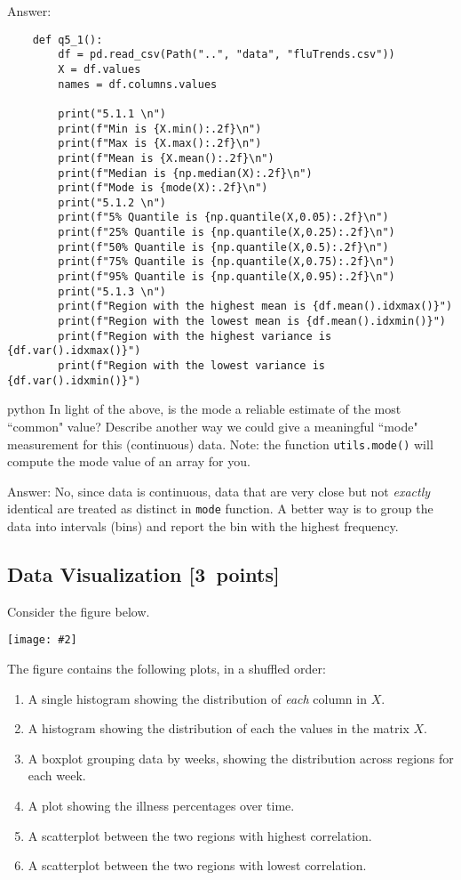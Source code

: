 \documentclass{article}
\newcommand{\blu}[1]{{\textcolor{blu}{#1}}}
\newenvironment{answer}{\par\begingroup\color{gre}Answer: }{\endgroup}
\let\ask\blu
\newcommand\pts[1]{\textcolor{pointscolour}{[#1~points]}}
\newcommand{\centerfig}[2]{\begin{center}\texttt{[image: \#2]}\end{center}}
\begin{document}
  \begin{answer}
      \begin{verbatim}
    def q5_1():
        df = pd.read_csv(Path("..", "data", "fluTrends.csv"))
        X = df.values
        names = df.columns.values
    
        print("5.1.1 \n")
        print(f"Min is {X.min():.2f}\n")
        print(f"Max is {X.max():.2f}\n")
        print(f"Mean is {X.mean():.2f}\n")
        print(f"Median is {np.median(X):.2f}\n")
        print(f"Mode is {mode(X):.2f}\n")
        print("5.1.2 \n")
        print(f"5% Quantile is {np.quantile(X,0.05):.2f}\n")
        print(f"25% Quantile is {np.quantile(X,0.25):.2f}\n")
        print(f"50% Quantile is {np.quantile(X,0.5):.2f}\n")
        print(f"75% Quantile is {np.quantile(X,0.75):.2f}\n")
        print(f"95% Quantile is {np.quantile(X,0.95):.2f}\n")
        print("5.1.3 \n")
        print(f"Region with the highest mean is {df.mean().idxmax()}")
        print(f"Region with the lowest mean is {df.mean().idxmin()}")
        print(f"Region with the highest variance is {df.var().idxmax()}")
        print(f"Region with the lowest variance is {df.var().idxmin()}")
        \end{verbatim}{python}
  \end{answer}
  In light of the above, \ask{is the mode a reliable estimate of the most ``common" value? Describe another way we could give a meaningful ``mode" measurement for this (continuous) data.} Note: the function \texttt{utils.mode()} will compute the mode value of an array for you.
  \begin{answer}
      No, since data is continuous, data that are very close but not \textit{exactly} identical are treated as distinct in \texttt{mode} function. A better way is to group the data into intervals (bins) and report the bin with the highest frequency.
  \end{answer}


  \subsection{Data Visualization \pts{3}}

  Consider the figure below.

  \centerfig{.9}{./figs/visualize-unlabeled}
  \newpage
  The figure contains the following plots, in a shuffled order:
  \begin{enumerate}
  \item A single histogram showing the distribution of \emph{each} column in $X$.
  \item A histogram showing the distribution of each the values in the matrix $X$.
  \item A boxplot grouping data by weeks, showing the distribution across regions for each week.
  \item A plot showing the illness percentages over time.
  \item A scatterplot between the two regions with highest correlation.
  \item A scatterplot between the two regions with lowest correlation.
  \end{enumerate}
\end{document}
